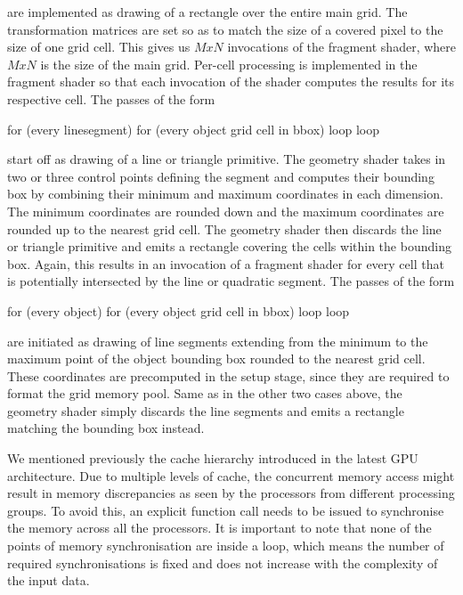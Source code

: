 \documentclass[11pt,a4paper,twoside]{article}
\newenvironment {code}{\footnotesize}{\normalsize}
\begin{document}
are implemented as drawing of a rectangle over the entire main grid. The transformation matrices are set so as to match the size of a covered pixel to the size of one grid cell. This gives us $M x N$ invocations of the fragment shader, where $M x N$ is the size of the main grid. Per-cell processing is implemented in the fragment shader so that each invocation of the shader computes the results for its respective cell. The passes of the form
\begin{code}
\begin {verbatimtab}[3]
for (every line\quad segment)
	for (every object grid cell in bbox)
	loop
loop
\end {verbatimtab}
\end{code}

start off as drawing of a line or triangle primitive. The geometry shader takes in two or three control points defining the segment and computes their bounding box by combining their minimum and maximum coordinates in each dimension. The minimum coordinates are rounded down and the maximum coordinates are rounded up to the nearest grid cell. The geometry shader then discards the line or triangle primitive and emits a rectangle covering the cells within the bounding box. Again, this results in an invocation of a fragment shader for every cell that is potentially intersected by the line or quadratic segment. The passes of the form
\begin{code}
\begin {verbatimtab}[3]
for (every object)
	for (every object grid cell in bbox)
	loop
loop
\end {verbatimtab}
\end{code}

are initiated as drawing of line segments extending from the minimum to the maximum point of the object bounding box rounded to the nearest grid cell. These coordinates are precomputed in the setup stage, since they are required to format the grid memory pool. Same as in the other two cases above, the geometry shader simply discards the line segments and emits a rectangle matching the bounding box instead.

We mentioned previously the cache hierarchy introduced in the latest GPU architecture. Due to multiple levels of cache, the concurrent memory access might result in memory discrepancies as seen by the processors from different processing groups. To avoid this, an explicit function call needs to be issued to synchronise the memory across all the processors. It is important to note that none of the points of memory synchronisation are inside a loop, which means the number of required synchronisations is fixed and does not increase with the complexity of the input data. 
\end{document}
